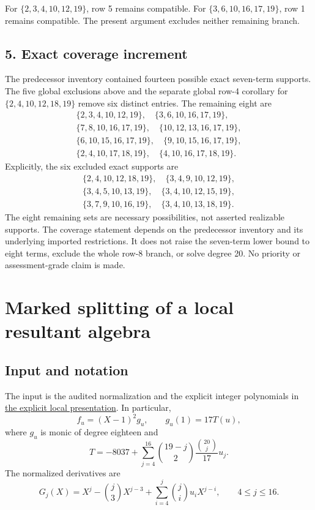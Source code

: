 \documentclass[
  british,
  10pt,
]{article}
\begin{document}
For \(\{2,3,4,10,12,19\}\), row 5 remains compatible. For
\(\{3,6,10,16,17,19\}\), row 1 remains compatible. The present argument
excludes neither remaining branch.

\subsection{5. Exact coverage increment}\label{exact-coverage-increment}

The predecessor inventory contained fourteen possible exact seven-term
supports. The five global exclusions above and the separate global row-4
corollary for \(\{2,4,10,12,18,19\}\) remove six distinct entries. The
remaining eight are \[
\begin{gathered}
\{2,3,4,10,12,19\},\quad
\{3,6,10,16,17,19\},\\
\{7,8,10,16,17,19\},\quad
\{10,12,13,16,17,19\},\\
\{6,10,15,16,17,19\},\quad
\{9,10,15,16,17,19\},\\
\{2,4,10,17,18,19\},\quad
\{4,10,16,17,18,19\}.
\end{gathered}
\] Explicitly, the six excluded exact supports are \[
\begin{gathered}
\{2,4,10,12,18,19\},\quad
\{3,4,9,10,12,19\},\\
\{3,4,5,10,13,19\},\quad
\{3,4,10,12,15,19\},\\
\{3,7,9,10,16,19\},\quad
\{3,4,10,13,18,19\}.
\end{gathered}
\] The eight remaining sets are necessary possibilities, not asserted
realizable supports. The coverage statement depends on the predecessor
inventory and its underlying imported restrictions. It does not raise
the seven-term lower bound to eight terms, exclude the whole row-8
branch, or solve degree 20. No priority or assessment-grade claim is
made.

\section{Marked splitting of a local resultant
algebra}\label{marked-splitting-of-a-local-resultant-algebra}

\subsection{Input and notation}\label{input-and-notation}

The input is the audited normalization and the explicit integer
polynomials in
\href{evidence/full/collective17/elimination/FINITE_FLAT_REDUCTION.md}{the
explicit local presentation}. In particular, \[
f_u=(X-1)^2g_u,\qquad
g_u(1)=17T(u),
\] where \(g_u\) is monic of degree eighteen and \[
T=-8037+\sum_{j=4}^{16}
\binom{19-j}{2}\frac{\binom{20}{j}}{17}u_j.
\] The normalized derivatives are \[
G_j(X)=X^j-\binom j3 X^{j-3}
+\sum_{i=4}^j\binom ji u_iX^{j-i},
\qquad 4\leq j\leq16.
\]
\end{document}
